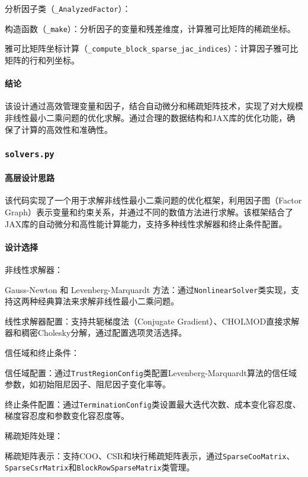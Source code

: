 \documentclass{ctexart}
\begin{document}
分析因子类（\texttt{\_AnalyzedFactor}）：

构造函数（\texttt{\_make}）：分析因子的变量和残差维度，计算雅可比矩阵的稀疏坐标。

雅可比矩阵坐标计算（\texttt{\_compute\_block\_sparse\_jac\_indices}）：计算因子雅可比矩阵的行和列坐标。

\paragraph{结论}

该设计通过高效管理变量和因子，结合自动微分和稀疏矩阵技术，实现了对大规模非线性最小二乘问题的优化求解。通过合理的数据结构和JAX库的优化功能，确保了计算的高效性和准确性。

\subsubsection{\texttt{solvers.py}}

\paragraph{高层设计思路}

该代码实现了一个用于求解非线性最小二乘问题的优化框架，利用因子图（Factor Graph）表示变量和约束关系，并通过不同的数值方法进行求解。该框架结合了JAX库的自动微分和高性能计算能力，支持多种线性求解器和终止条件配置。

\paragraph{设计选择}

非线性求解器：

Gauss-Newton 和 Levenberg-Marquardt 方法：通过\texttt{NonlinearSolver}类实现，支持这两种经典算法来求解非线性最小二乘问题。

线性求解器配置：支持共轭梯度法（Conjugate Gradient）、CHOLMOD直接求解器和稠密Cholesky分解，通过配置选项灵活选择。

信任域和终止条件：

信任域配置：通过\texttt{TrustRegionConfig}类配置Levenberg-Marquardt算法的信任域参数，如初始阻尼因子、阻尼因子变化率等。

终止条件配置：通过\texttt{TerminationConfig}类设置最大迭代次数、成本变化容忍度、梯度容忍度和参数变化容忍度等。

稀疏矩阵处理：

稀疏矩阵表示：支持COO、CSR和块行稀疏矩阵表示，通过\texttt{SparseCooMatrix}、\texttt{SparseCsrMatrix}和\texttt{BlockRowSparseMatrix}类管理。
\end{document}
